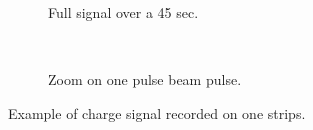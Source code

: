 \begin{figure}[!ht]
  \begin{subfigure}[t]{0.5\textwidth}
    
    \caption{Full signal over a 45 sec.}
    \label{}
  \end{subfigure}
  ~
  \begin{subfigure}[t]{0.5\textwidth}
    
    \caption{Zoom on one pulse beam pulse.}
    \label{}
  \end{subfigure}
  \caption[Example of charge signal recorded on one strips]{Example of charge signal recorded on one strips.}
  \label{chap4:strips_signal}
\end{figure}
